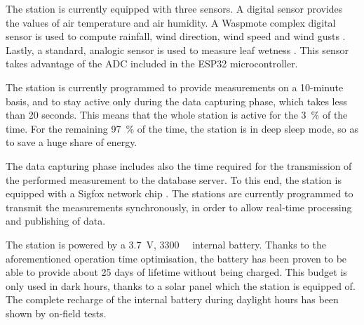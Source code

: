 \documentclass[conference]{IEEEtran}
\begin{document}
The station is currently equipped with three sensors. A digital sensor provides the values of air temperature and air humidity. %
A Waspmote complex digital sensor is used to compute rainfall, wind direction, wind speed and wind gusts \cite{libellium:ws3000}. Lastly, a standard, analogic sensor is used to measure leaf wetness \cite{vaisala:yl83-leaf-wetness}. This sensor takes advantage of the ADC included in the ESP32 microcontroller.


The station is currently programmed to provide measurements on a 10-minute basis, and to stay active only during the data capturing phase, which takes less than 20 seconds. This means that the whole station is active for the \SI{3}{\%} of the time. For the remaining \SI{97}{\%} of the time, the station is in deep sleep mode, so as to save a huge share of energy. %

The data capturing phase includes also the time required for the transmission of the performed measurement to the database server. To this end, the station is equipped with a Sigfox network chip \cite{sigfox:module}. The stations are currently programmed to transmit the measurements synchronously, in order to allow real-time processing and publishing of data.

The station is powered by a \SI{3.7}{\volt}, \SI{3300}{\milli\amperehour} internal battery. Thanks to the aforementioned operation time optimisation, the battery has been proven to be able to provide about 25 days of lifetime without being charged. This budget is only used in dark hours, thanks to a solar panel which the station is equipped of. 
The complete recharge of the internal battery %
during daylight hours has been shown by on-field tests.
\end{document}
